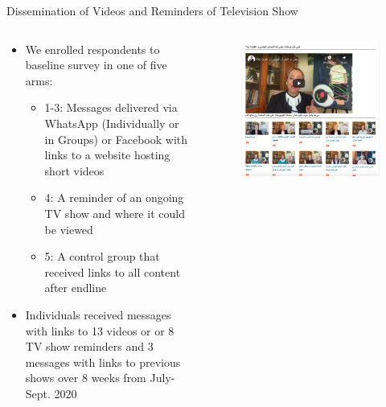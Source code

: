 \documentclass[10pt]{beamer}
\begin{document}
\begin{frame}{Dissemination of Videos and Reminders of Television Show}
\begin{columns}[T] \begin{column}{0.55\textwidth}
\begin{itemize}
     \item We enrolled respondents to baseline survey in one of five arms:
    \begin{itemize}
    \item 1-3: Messages delivered via WhatsApp (Individually or in Groups) or Facebook with links to a website hosting short videos 
    \item 4: A reminder of an ongoing TV show and where it could be viewed
    \item 5: A control group that received links to all content after endline
    \end{itemize}
     \item Individuals received messages with links to 13 videos or or 8 TV show reminders and 3 messages with links to previous shows over 8 weeks from July-Sept. 2020
\end{itemize}
\end{column}
\begin{column}{0.5\textwidth}
\begin{figure} \includegraphics[width = 1\textwidth]{Recruit_Intervention/mshlwa7dek.org:egypt:v1wfb.png}\captionsetup{font=small}

\end{figure}
\end{column}
\end{columns}
\end{frame}
\end{document}

